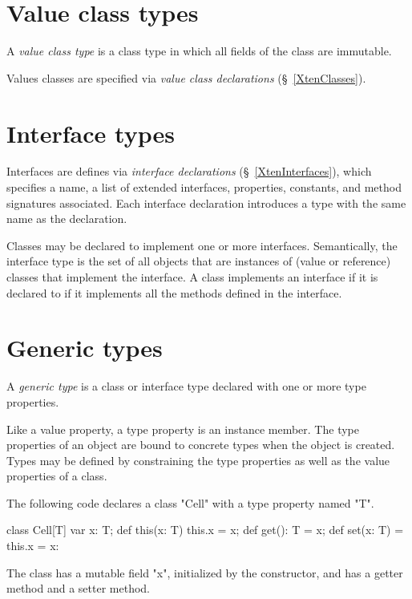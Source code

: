 \section{Value class types}

A {\em value class type}
is a class type in which all fields of the class are immutable.

Values classes are specified via {\em value class declarations}
(\S~\ref{XtenClasses}).

\section{Interface types}\label{InterfaceTypes}

Interfaces are defines via {\em interface declarations}
(\S~\ref{XtenInterfaces}),
which specifies a name, a list of extended
interfaces, properties,
constants, and
method signatures associated. Each interface
declaration introduces a type with the same name as the declaration.

Classes may be declared to implement 
one or more interfaces.  
Semantically, the interface type is the set of all objects that are
instances of (value or reference) classes that implement the
interface. A class implements an interface if it is declared to if
it implements all the methods defined in the interface.

\section{Generic types}

A {\em generic type} is a class or interface type declared with
one or more type properties.

Like a value property, a type property is an instance member.
The type properties of an object are bound to concrete types
when the object is
created.
Types may be defined by constraining the type properties as
well as the value properties of a class.

The following code declares a class \xcd"Cell" with a type
property named \xcd"T".
\begin{xten}
class Cell[T] {
    var x: T;
    def this(x: T) { this.x = x; }
    def get(): T = x;
    def set(x: T) = { this.x = x: }
}
\end{xten}
The class has a mutable field \xcd"x", initialized by the
constructor, and has a getter method and a setter method.

